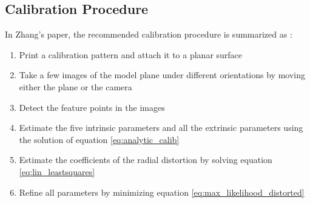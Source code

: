 \subsection{Calibration Procedure}
In Zhang's paper, the recommended calibration procedure is summarized as \cite{flexCal}:
\begin{enumerate}
    \item Print a calibration pattern and attach it to a planar surface
    \item Take a few images of the model plane under different orientations by moving either the plane or the camera
    \item Detect the feature points in the images
    \item Estimate the five intrinsic parameters and all the extrinsic parameters using the solution of equation \ref{eq:analytic_calib}
    \item Estimate the coefficients of the radial distortion by solving equation \ref{eq:lin_leastsquares}
    \item Refine all parameters by minimizing equation \ref{eq:max_likelihood_distorted}
\end{enumerate}